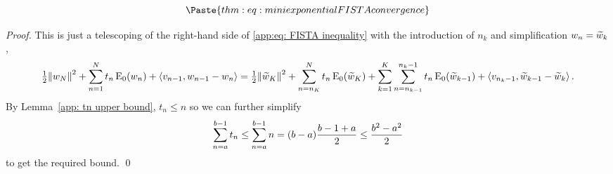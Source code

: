 \documentclass[smallextended]{svjour3}
\newcommand{\norm}[1]{{\left\lVert #1 \right\rVert}}
\newcommand{\IP}[2]{\left\langle #1,#2 \right\rangle}
\newcommand{\op}[1]{\operatorname{#1}}
\newcommand{\1}{\F{1}}
\newcommand*{\var}[1]{%
	\IfEqCase{#1}{%
		{0}{u}%
		{1}{v}%
		{2}{w}%
	}[u#1]%
}
\newcommand*{\vars}[1]{%
	\IfEqCase{#1}{%
		{0}{\alpha}%
		{1}{\beta}%
		{2}{\gamma}%
		{3}{a}%
		{4}{b}%
		{5}{c}%
	}[k#1]%
}
\begin{document}
	
	
	\begin{lemma}\label{app:thm: mini exponential FISTA convergence}
		\begin{equation}
			\Paste{thm:eq: mini exponential FISTA convergence}
		\end{equation}
	\end{lemma}
	\begin{proof}
		This is just a telescoping of the right-hand side of \eqref{app:eq: FISTA inequality} with the introduction of $n_k$ and simplification $\var2_n = \tilde{\var2}_k$,
		\begin{equation}
			\tfrac12\norm{\var2_N}^2 + \sum^N_{n=1} t_n\op{E}_0(\var2_n) + \IP{\var1_{n-1}}{\var2_{n-1}-\var2_n} = \tfrac12\norm{\tilde{\var2}_K}^2 + \sum_{n=n_K}^Nt_n\op{E}_0(\tilde{\var2}_K) 
			+ \sum_{k=1}^K\sum_{n=n_{k-1}}^{n_k-1}t_n\op{E}_0(\tilde{\var2}_{k-1}) 
			+ \IP{\var1_{n_k-1}}{\tilde{\var2}_{k-1}-\tilde{\var2}_k}.
		\end{equation}
		By Lemma~\ref{app: tn upper bound}, $t_n\leq n$ so we can further simplify
		$$\sum_{n=\vars3}^{\vars4-1}t_n \leq \sum_{n=\vars3}^{\vars4-1}n = (\vars4-\vars3)\frac{\vars4-1+\vars3}{2} \leq \frac{\vars4^2-\vars3^2}{2}$$
		to get the required bound.
		\qed\end{proof}
	
\end{document}

